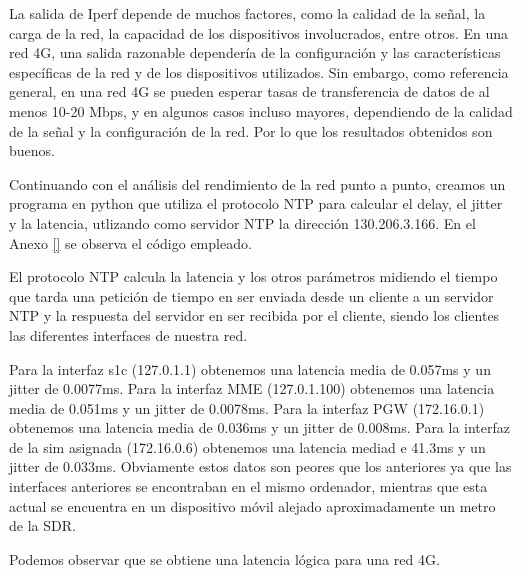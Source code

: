 La salida de Iperf depende de muchos factores, como la calidad de la señal, la carga de la red, la capacidad de los dispositivos involucrados, entre otros.
En una red 4G, una salida razonable dependería de la configuración y las características específicas de la red y de los dispositivos utilizados. Sin embargo, como referencia general, en una red 4G se pueden esperar tasas de transferencia de datos de al menos 10-20 Mbps, y en algunos casos incluso mayores, dependiendo de la calidad de la señal y la configuración de la red. Por lo que los resultados obtenidos son buenos. 

Continuando con el análisis del rendimiento de la red punto a punto, creamos un programa en python que utiliza el protocolo NTP para calcular el delay, el jitter y la latencia, utlizando como servidor NTP la dirección 130.206.3.166. En el Anexo \ref{} se observa el código empleado.

El protocolo NTP calcula la latencia y los otros parámetros midiendo el tiempo que tarda una petición de tiempo en ser enviada desde un cliente a un servidor NTP y la respuesta del servidor en ser recibida por el cliente, siendo los clientes las diferentes interfaces de nuestra red.

Para la interfaz s1c (127.0.1.1) obtenemos una latencia media de 0.057ms y un jitter de 0.0077ms.
Para la interfaz MME (127.0.1.100) obtenemos una latencia media de 0.051ms y un jitter de 0.0078ms.
Para la interfaz PGW (172.16.0.1) obtenemos una latencia media de 0.036ms y un jitter de 0.008ms.
Para la interfaz de la sim asignada (172.16.0.6) obtenemos una latencia mediad e 41.3ms y un jitter de 0.033ms. Obviamente estos datos son peores que los anteriores ya que las interfaces anteriores se encontraban en el mismo ordenador, mientras que esta actual se encuentra en un dispositivo móvil alejado aproximadamente un metro de la SDR.

Podemos observar que se obtiene una latencia lógica para una red 4G.


